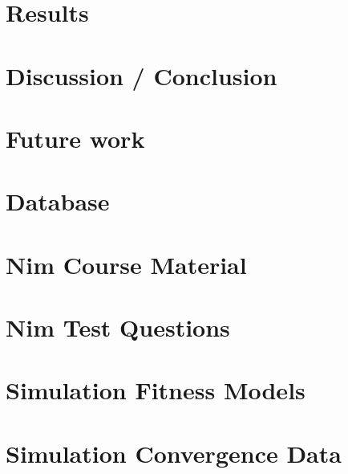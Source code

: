 \documentclass{memoir}
\begin{document}
\chapter{Results}
\label{ch:results}

\chapter{Discussion / Conclusion}
\label{ch:discussion_conclusion}

\chapter{Future work}
\label{ch:future_work}






\appendix
\chapter{Database}
\label{ax_database}

\chapter{Nim Course Material}
\label{ax_resources}

\chapter{Nim Test Questions}
\label{ax_questions}

\chapter{Simulation Fitness Models}
\label{ax_simulation_fitness_models}

\chapter{Simulation Convergence Data}
\label{ax_simulation_convergence_data}

\end{document}
